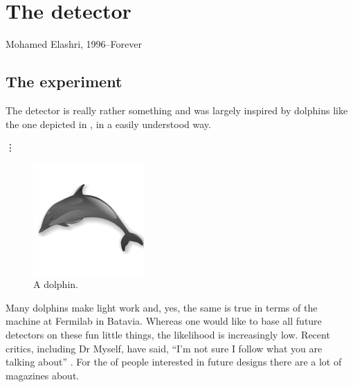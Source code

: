 \chapter{The detector}
\label{chap:ATLAS}

{Mohamed Elashri, 1996--Forever}


\section{The \nova experiment}
\label{sec:ATLASDescription}

The \nova detector is really rather something and was largely inspired by dolphins like the one depicted in , in a easily understood way.
\vspace{1cm}

\begin{center}
{\hspace{1mm}\Large\vdots\hspace{1cm}}
\end{center}

\newpage

\begin{figure}
  \begin{center}
      \includegraphics[width=0.5\textheight]{dolphin}
      \caption[The dolphin that inspired \nova]%
              {A dolphin.}
    \label{fig:dolphin}
  \end{center}
\end{figure}

Many dolphins make light work and, yes, the same is true in terms of the
\nova machine at Fermilab in Batavia. Whereas one would like to base all
future detectors on these fun little things, the likelihood is increasingly
low. Recent critics, including Dr Myself, have said, ``I'm not sure I follow what you are talking about'' \cite{buckley2016results}. For the \about{50\percent} of people interested in future designs there are a lot of magazines about.

